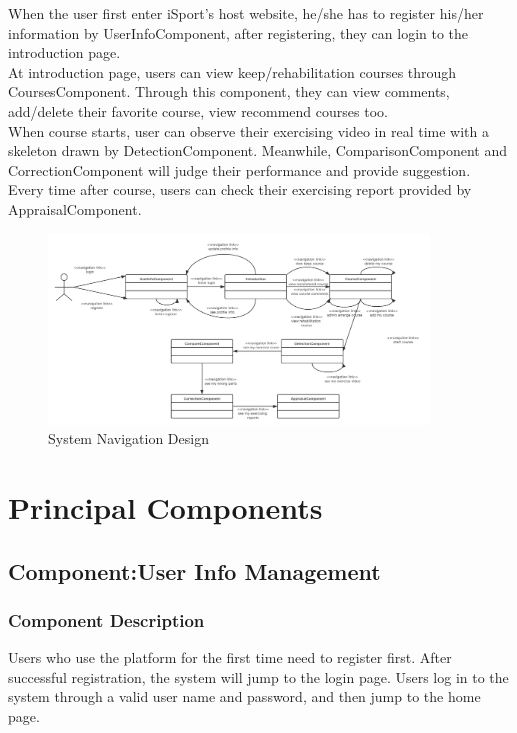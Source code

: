 \documentclass[16pt]{scrreprt}
\begin{document}
\noindent When the user first enter iSport's host website, he/she has to register his/her information by UserInfoComponent, after registering, they can login to the introduction page.\\

\noindent At introduction page, users can view keep/rehabilitation courses through CoursesComponent. Through this component, they can view comments, add/delete their favorite course, view recommend courses too.\\

\noindent When course starts, user can observe their exercising video in real time with a skeleton drawn by DetectionComponent. Meanwhile, ComparisonComponent and CorrectionComponent will judge their performance and provide suggestion.\\

\noindent Every time after course, users can check their exercising report provided by AppraisalComponent.  
\begin{figure}[H]
  \centering
  \includegraphics[width=0.9\textwidth]{diagrams/navigation.png}
  \caption{System Navigation Design}
\end{figure}

\chapter{Principal Components}
	
\section{Component:User Info Management}
\subsection{Component Description}
Users who use the platform for the first time need to register first. After successful registration, the system will jump to the login page. Users log in to the system through a valid user name and password, and then jump to the home page.\\
\end{document}
